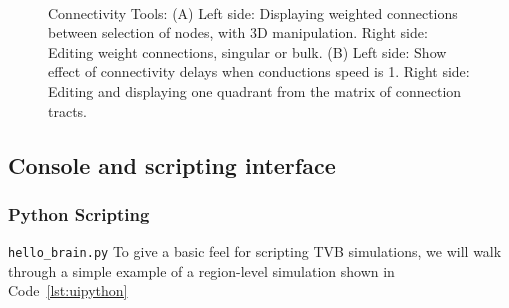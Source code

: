  \begin{figure}[!htbp]
 	\centering
	\\
	\caption{Connectivity Tools: 
	(A) Left side: Displaying weighted connections between selection of nodes, with 3D manipulation.
	Right side: Editing weight connections, singular or bulk.
	(B) Left side: Show effect of connectivity delays when conductions speed is 1.
	Right side: Editing and displaying one quadrant from the matrix of connection tracts.}
        \label{fig:connectivity}
\end{figure}


\subsection{Console and scripting interface}


\subsubsection{Python Scripting}

\texttt{hello\_brain.py}
To give a basic feel for scripting TVB simulations, we will 
walk through a simple example of a region-level simulation shown in
Code~\ref{lst:uipython}




